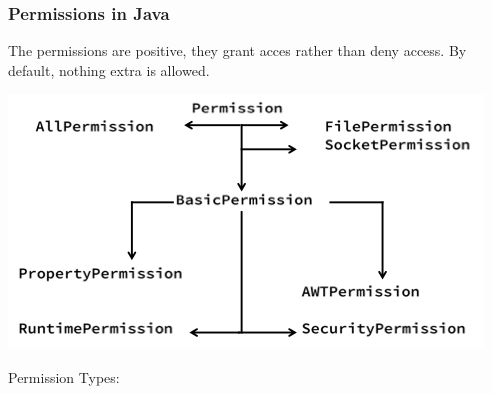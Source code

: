 \documentclass[10pt]{article}
\begin{document}
\subsubsection{Permissions in Java}
The permissions are positive, they grant acces rather than deny access. By default, nothing extra is allowed.
\begin{center}
\includegraphics[scale=0.5]{permission-tree.png}
\end{center}
Permission Types:
\end{document}
